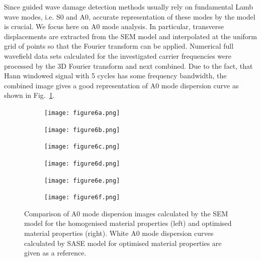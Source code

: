 \documentclass[preprint,12pt]{elsarticle}
\begin{document}
Since guided wave damage detection methods usually rely on fundamental Lamb wave modes, i.e. S0 and A0, accurate representation of these modes by the model is crucial.
We focus here on A0 mode analysis. 
In particular, transverse displacements are extracted from the SEM model and interpolated at the uniform grid of points so that the Fourier transform can be applied. 
Numerical full wavefield data sets calculated for the investigated carrier frequencies were processed by the 3D Fourier transform and next combined. 
Due to the fact, that Hann windowed signal with 5 cycles has some frequency bandwidth, the combined image gives a good representation of A0 mode dispersion curve as shown in Fig.~\ref{fig:homog_opt_num}. 
\begin{figure} [h!]
	\centering
	\begin{subfigure}[b]{0.47\textwidth}
		\centering
		\texttt{[image: figure6a.png]}
	\end{subfigure}
	\hfill
	\begin{subfigure}[b]{0.47\textwidth}
		\centering
		\texttt{[image: figure6b.png]}
	\end{subfigure}
	\hfill
	\begin{subfigure}[b]{0.47\textwidth}
		\centering
		\texttt{[image: figure6c.png]}
	\end{subfigure}
	\hfill
	\begin{subfigure}[b]{0.47\textwidth}
		\centering
		\texttt{[image: figure6d.png]}
	\end{subfigure}
	\hfill
	\begin{subfigure}[b]{0.47\textwidth}
		\centering
		\texttt{[image: figure6e.png]}
	\end{subfigure}
	\hfill
	\begin{subfigure}[b]{0.47\textwidth}
		\centering
		\texttt{[image: figure6f.png]}
	\end{subfigure}
	\caption{Comparison of A0 mode dispersion images calculated by the SEM model for the homogenised material properties (left) and optimised material properties (right). White A0 mode dispersion curves calculated by SASE model for optimised material properties are given as a reference. }
	\label{fig:homog_opt_num}
\end{figure}
\end{document}
